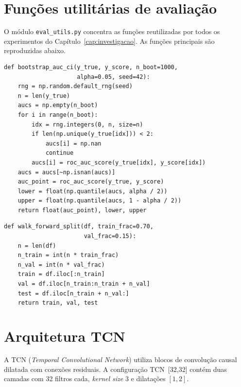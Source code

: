 \chapter{Funções utilitárias de avaliação}\label{ap:evalutils}

O módulo \texttt{eval\_utils.py} concentra as funções reutilizadas por todos os experimentos do Capítulo~\ref{cap:investigacao}. As funções principais são reproduzidas abaixo.

\begin{lstlisting}[caption={Intervalo de confiança \textit{bootstrap} para ROC-AUC.},label={lst:bootstrap}]
def bootstrap_auc_ci(y_true, y_score, n_boot=1000,
                     alpha=0.05, seed=42):
    rng = np.random.default_rng(seed)
    n = len(y_true)
    aucs = np.empty(n_boot)
    for i in range(n_boot):
        idx = rng.integers(0, n, size=n)
        if len(np.unique(y_true[idx])) < 2:
            aucs[i] = np.nan
            continue
        aucs[i] = roc_auc_score(y_true[idx], y_score[idx])
    aucs = aucs[~np.isnan(aucs)]
    auc_point = roc_auc_score(y_true, y_score)
    lower = float(np.quantile(aucs, alpha / 2))
    upper = float(np.quantile(aucs, 1 - alpha / 2))
    return float(auc_point), lower, upper
\end{lstlisting}

\begin{lstlisting}[caption={Split temporal walk-forward 70/15/15.},label={lst:walkforward}]
def walk_forward_split(df, train_frac=0.70,
                       val_frac=0.15):
    n = len(df)
    n_train = int(n * train_frac)
    n_val = int(n * val_frac)
    train = df.iloc[:n_train]
    val = df.iloc[n_train:n_train + n_val]
    test = df.iloc[n_train + n_val:]
    return train, val, test
\end{lstlisting}

\chapter{Arquitetura TCN}\label{ap:tcn}

A TCN (\textit{Temporal Convolutional Network}) utiliza blocos de convolução causal dilatada com conexões residuais. A configuração TCN~[32,32] contém duas camadas com 32 filtros cada, \textit{kernel size} 3 e dilatações $[1, 2]$.

